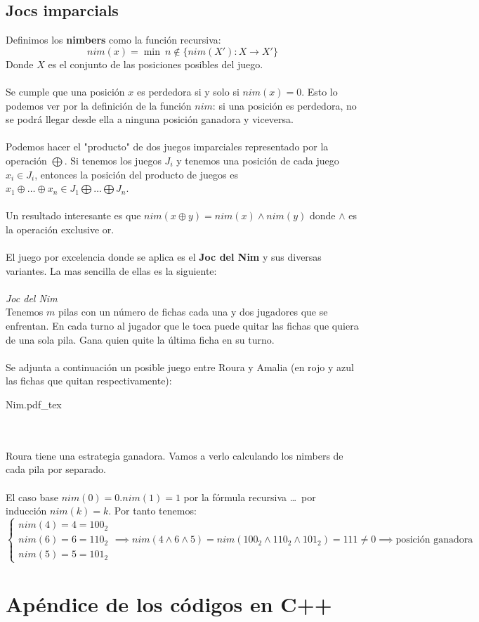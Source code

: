 \documentclass{myclass}
\newcommand{\incfig}[1]{%
  \begin{center}
  \def\svgwidth{0.9\columnwidth}
  {#1.pdf_tex}
  \end{center}
}
\begin{document}
\subsection{Jocs imparcials}
Definimos los \textbf{nimbers} como la función recursiva:
\[
nim(x) = \min \ n\not\in \{nim(X') : X\to X'\}
\]
Donde $X$ es el conjunto de las posiciones posibles del juego.\\
\\
Se cumple que una posición $x$ es perdedora si y solo si $nim(x)=0$. Esto lo podemos ver por la definición de la función $nim$: si una posición es perdedora, no se podrá llegar desde ella a ninguna posición ganadora y viceversa.\\
\\
Podemos hacer el "producto" de dos juegos imparciales representado por la operación $\bigoplus$. Si tenemos los juegos $J_i$ y tenemos una posición de cada juego $x_i\in J_i$, entonces la posición del producto de juegos es $x_1\oplus\ldots\oplus x_n\in J_1\bigoplus\ldots\bigoplus J_n$.\\
\\
Un resultado interesante es que $nim(x\oplus y) = nim(x) \wedge nim(y)$ donde $\wedge$ es la operación exclusive or.\\
\\
El juego por excelencia donde se aplica es el \textbf{Joc del Nim} y sus diversas variantes. La mas sencilla de ellas es la siguiente: \\
\\
\textit{Joc del Nim}\\
Tenemos $m$ pilas con un número de fichas cada una y dos jugadores que se enfrentan. En cada turno al jugador que le toca puede quitar las fichas que quiera de una sola pila. Gana quien quite la última ficha en su turno.\\
\\
Se adjunta a continuación un posible juego entre Roura y Amalia (en rojo y azul las fichas que quitan respectivamente):\\
\incfig{Nim}
\\
\\
Roura tiene una estrategia ganadora. Vamos a verlo calculando los nimbers de cada pila por separado. \\
\\
El caso base $nim(0)=0$.$nim(1)=1$ por la fórmula recursiva  \ldots \ por inducción $nim(k)=k$. Por tanto tenemos:
 \[
\begin{cases}
  nim(4)=4=100_2 \\
  nim(6)=6 = 110_2\\
  nim(5)=5 = 101_2
\end{cases}
\implies nim(4\wedge 6 \wedge 5) =  nim(100_2\wedge 110_2 \wedge 101_2) = 111 \neq 0 \implies \boxed{\text{posición ganadora}}
\] 

\section{Apéndice de los códigos en C++}


\end{document}
